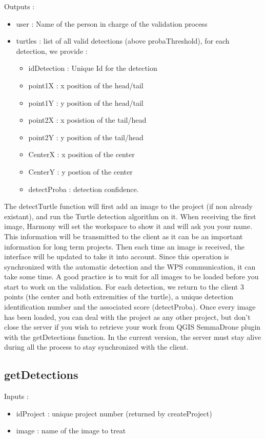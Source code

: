 \documentclass{article}
\begin{document}
	Outputs :
	\begin{itemize}
	 \item user : Name of the person in charge of the validation process 
     \item turtles : list of all valid detections (above probaThreshold), for each detection, we provide :
   	 	\begin{itemize}
    		\item idDetection : Unique Id for the detection
    		\item point1X : x position of the head/tail
    		\item point1Y : y position of the head/tail
    		\item point2X : x posistion of the tail/head 
    		\item point2Y : y position of the tail/head
    		\item CenterX : x position of the center
    		\item CenterY : y postion of the center
    		\item detectProba : detection confidence.
    	\end{itemize}
    \end{itemize}
   

 

 The detectTurtle function will first add an image to the project (if non already existant), and run the Turtle detection algorithm on it. When receiving the first image, Harmony will set the workspace to show it and will ask you your name. This information will be transmitted to the client as it can be an important information for long term projects. Then each time an image is received, the interface will be updated to take it into account. Since this operation is synchronized with the automatic detection and the WPS communication, it can take some time. A good practice is to wait for all images to be loaded before you start to work on the validation. For each detection, we return to the client 3 points (the center and both extremities of the turtle), a unique detection identification number and the associated score (detectProba). Once every image has been loaded, you can deal with the project as any other project, but don't close the server if you wish to retrieve your work from QGIS SemmaDrone plugin with the getDetections function. In the current version, the server must stay alive during all the process to stay synchronized with the client.
 
 \subsection{getDetections}
Inputs :
  \begin{itemize}
    \item idProject :  unique project number (returned by createProject)
    \item image : name of the image to treat
  \end{itemize}
\end{document}
